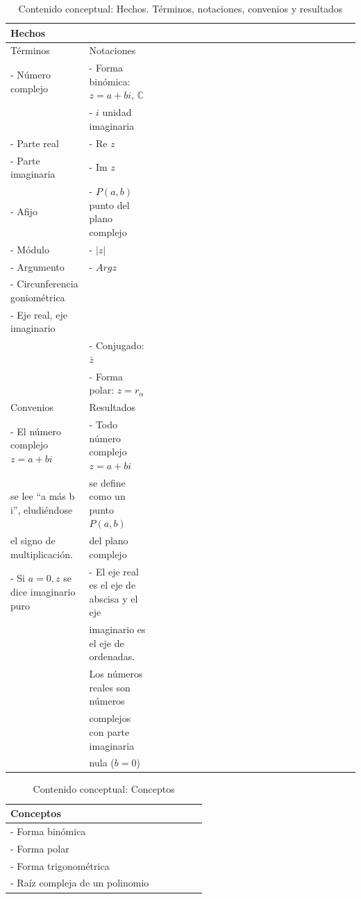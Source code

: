 \documentclass[../main.tex]{memoir}
\begin{document}
\begin{table}[H]
	\centering
	\begin{tabular}{llccccccccccccccccccccc}
		\toprule
		\hspace{5.8cm}\textbf{Hechos} \\
		\midrule
		Términos & Notaciones \\
		\midrule
		- Número complejo & - Forma binómica: $z = a +bi$, $\mathbb{C}$ \\
		& - $i$ unidad imaginaria \\
		- Parte real & - Re $z$ \\
		- Parte imaginaria & - Im $z$ \\
		- Afijo & - $P(a,b)$ punto del plano complejo\\
		- Módulo & - $|z|$ \\
		- Argumento & - $Arg z$ \\
		- Circunferencia goniométrica  & \\
		- Eje real, eje imaginario & \\
		 & - Conjugado: $\bar{z}$ \\
		 & - Forma polar: $z = r_\alpha$ \\
		\midrule
		Convenios & Resultados \\
		\midrule
		- El número complejo $z = a +bi$  & - Todo número complejo $z = a +bi$ \\
		se lee ``a más b i'', eludiéndose & se define como un punto $P(a,b)$  \\
		el signo de multiplicación. & del plano complejo  \\
		- Si $a=0, z$ se dice imaginario puro & - El eje real es el eje de abscisa y el eje \\
		&  imaginario es el eje de ordenadas. \\
		& Los números reales son números  \\
		& complejos con parte imaginaria  \\
		& nula ($b=0$) \\
		\bottomrule
	\end{tabular}
	\caption{Contenido conceptual: Hechos. Términos, notaciones, convenios y resultados}
	\label{tab:terminos-notaciones}
\end{table}


\begin{table}[H]
	\centering
	\begin{tabular}{lccccc}
		\toprule
		\hspace{2cm}Conceptos \\
		\midrule
		- Forma binómica \\
		- Forma polar \\
		- Forma trigonométrica\\
		- Raíz compleja de un polinomio \\
		\bottomrule
	\end{tabular}
	\caption{Contenido conceptual: Conceptos}
	\label{tab:conceptos2}
\end{table}
\end{document}
